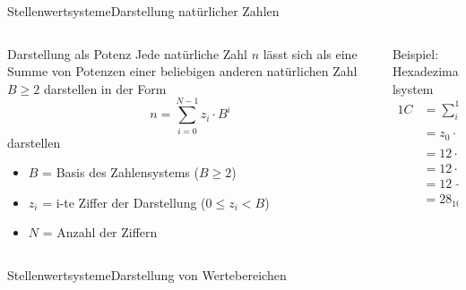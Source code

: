 \documentclass[xelatex,aspectratio=169]{beamer}
\begin{document}
\begin{frame}{Stellenwertsysteme}{Darstellung natürlicher Zahlen}
  \begin{columns}
    \begin{column}{0.5\textwidth}
      \begin{block}{Darstellung als Potenz}
        Jede natürliche Zahl \(n\) lässt sich als eine Summe von Potenzen einer beliebigen anderen natürlichen Zahl \(B \geq 2 \) darstellen in der Form
        \[
          n = \sum_{i=0}^{N-1} z_i \cdot B^i
        \]
        darstellen
        \begin{itemize}
          \item \(B\) = Basis des Zahlensystems (\(B \geq 2\))
          \item \(z_i\) = i-te Ziffer der Darstellung (\(0 \leq z_i < B\))
          \item \(N\) = Anzahl der Ziffern
        \end{itemize}
      \end{block}
    \end{column}
    \begin{column}{0.5\textwidth}
      \begin{exampleblock}{Beispiel: Hexadezimalsystem}
        \smaller
        \begin{align*}
          1C & = \sum_{i=0}^{1} z_i \cdot 16^i   \\
             & = z_0 \cdot 16^0 + z_1 \cdot 16^1 \\
             & = 12 \cdot 16^0 + 1 \cdot 16^1    \\
             & = 12 \cdot 1 + 1 \cdot 16         \\
             & = 12 + 16                         \\
             & = 28_{10}
        \end{align*}
      \end{exampleblock}
    \end{column}
  \end{columns}
\end{frame}

\begin{frame}{Stellenwertsysteme}{Darstellung von Wertebereichen}

  \begin{columns}
    \begin{column}{0.5\textwidth}
    \end{column}
    \begin{column}{0.5\textwidth}
    \end{column}
  \end{columns}
\end{frame}


\end{document}
